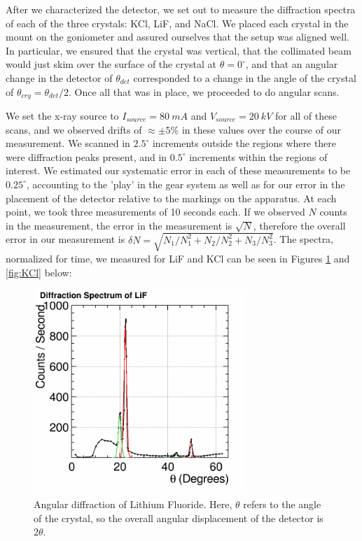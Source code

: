 \documentclass[%
 reprint,
 amsmath,amssymb,
 aps,
 pra,
]{revtex4-1}
\begin{document}
After we characterized the detector, we set out to measure the diffraction spectra of each of the three crystals: KCl, LiF, and NaCl. We placed each crystal in the mount on the goniometer and assured ourselves that the setup was aligned well. In particular, we ensured that the crystal was vertical, that the collimated beam would just skim over the surface of the crystal at $\theta = 0^\circ$, and that an angular change in the detector of $\theta_{det}$ corresponded to a change in the angle of the crystal of $\theta_{cry} = \theta_{det}/2$. Once all that was in place, we proceeded to do angular scans. 

We set the x-ray source to $I_{source} = 80~mA$ and $V_{source} = 20~kV$ for all of these scans, and we observed drifts of $\approx \pm 5\%$ in these values over the course of our measurement. We scanned in $2.5^\circ$ increments outside the regions where there were diffraction peaks present, and in $0.5^\circ$ increments within the regions of interest. We estimated our systematic error in each of these measurements to be $0.25^\circ$, accounting to the 'play' in the gear system as well as for our error in the placement of the detector relative to the markings on the apparatus. At each point, we took three measurements of 10 seconds each. If we observed $N$ counts in the measurement, the error in the measurement is $\sqrt{N}$, therefore the overall error in our measurement is $\delta N =\sqrt{N_1/N_1^2 + N_2/N_2^2 + N_3/N_3^2}$. The spectra, normalized for time, we measured for LiF and KCl can be seen in Figures \ref{fig:LiF} and \ref{fig:KCl} below:

\begin{figure}[H]
	\centering
	\includegraphics[width=8cm]{Diffraction_LiF.png}
	\caption{Angular diffraction of Lithium Fluoride. Here, $\theta$ refers to the angle of the crystal, so the overall angular displacement of the detector is $2 \theta$.}
	\label{fig:LiF}
\end{figure}
\end{document}
